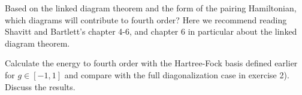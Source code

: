 \documentclass[prc]{revtex4}
\begin{document}
\begin{enumerate}
Based on the linked diagram theorem and the form of the pairing Hamiltonian, which diagrams will contribute
to fourth order?  Here we recommend reading Shavitt and Bartlett's chapter 4-6, and chapter 6 in particular about the linked diagram theorem.

Calculate the energy to fourth order with the Hartree-Fock basis defined earlier for $g\in [-1,1]$ and compare
with the full diagonalization case in exercise 2). Discuss the results.
\end{enumerate}
\end{document}
